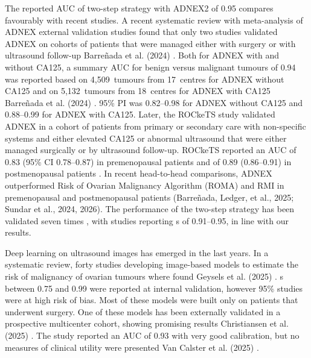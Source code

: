 The reported \gls{AUC} of two-step strategy with ADNEX2 of 0.95 compares favourably with recent studies. A recent systematic review with meta-analysis of \gls{ADNEX} external validation studies found that only two studies validated \gls{ADNEX} on cohorts of patients that were managed either with surgery or with ultrasound follow-up Barreñada et al. (2024) \cite{barrenadaADNEXRiskPrediction2024}. Both for \gls{ADNEX} with and without \gls{CA125}, a summary \gls{AUC} for benign versus malignant tumours of 0.94 was reported based on 4,509~tumours from 17~centres for \gls{ADNEX} without \gls{CA125} and on 5,132~tumours from 18~centres for \gls{ADNEX} with \gls{CA125} Barreñada et al. (2024) \cite{barrenadaADNEXRiskPrediction2024}. 95\% \gls{PI} was 0.82--0.98 for \gls{ADNEX} without \gls{CA125} and 0.88--0.99 for \gls{ADNEX} with \gls{CA125}. Later, the ROCkeTS study validated \gls{ADNEX} in a cohort of patients from primary or secondary care with non-specific systems and either elevated \gls{CA125} or abnormal ultrasound that were either managed surgically or by ultrasound follow-up. ROCkeTS reported an \gls{AUC} of 0.83 (95\% \gls{CI} 0.78--0.87) in premenopausal patients and of 0.89 (0.86--0.91) in postmenopausal patients \cite{sundarRiskpredictionModelsPostmenopausal2024,sundarDiagnosticTestsOvarian2026}. In recent head-to-head comparisons, \gls{ADNEX} outperformed Risk of Ovarian Malignancy Algorithm (\gls{ROMA}) and \gls{RMI} in premenopausal and postmenopausal patients (Barreñada, Ledger, et al., 2025; Sundar et al., 2024, 2026). The performance of the two-step strategy has been validated seven times \cite{barcroftEvaluatingUseTwostep2024,borgesProspectiveExternalValidation2024, devitisDiagnosticAlgorithmsAdnexal2025, einigExternalValidationIOTA2025, pascualValidationADNEXIOTA2024,perryCostConsequenceAnalysis2026, timmermanExternalValidationOvarianAdnexal2023}, with studies reporting s of 0.91--0.95, in line with our results.

Deep learning on ultrasound images has emerged in the last years. In a systematic review, forty studies developing image-based models to estimate the risk of malignancy of ovarian tumours where found Geysels et al. (2025) \cite{geyselsArtificialIntelligenceApplied2025}. s between 0.75 and 0.99 were reported at internal validation, however 95\% studies were at high risk of bias. Most of these models were built only on patients that underwent surgery. One of these models has been externally validated in a prospective multicenter cohort, showing promising results Christiansen et al. (2025) \cite{christiansenInternationalMulticenterValidation2025}. The study reported an \gls{AUC} of 0.93 with very good calibration, but no measures of clinical utility were presented Van Calster et al. (2025) \cite{vancalsterPerformanceEvaluationPredictive2024}.

